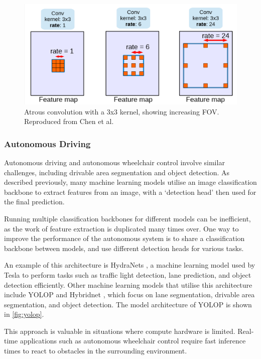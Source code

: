 \documentclass[12pt]{article}
\begin{document}
\begin{figure}[H]
    \centering
    \includegraphics[width=0.6\linewidth]{images/atrous_convolution.png}
    \caption{Atrous convolution with a 3x3 kernel, showing increasing FOV. Reproduced from Chen et al. \cite{chenRethinkingAtrousConvolution2017}}
    \label{fig:atrous_convolution}
\end{figure}

\subsubsection{Autonomous Driving}
Autonomous driving and autonomous wheelchair control involve similar challenges,
including drivable area segmentation and object detection. As described previously, many machine learning
models utilise an image classification backbone to extract features from an image, with a `detection head'
then used for the final prediction.

Running multiple classification backbones for different models can be inefficient, as
the work of feature extraction is duplicated many times over. One way to improve the performance
of the autonomous system is to share a classification backbone between models, and use different detection
heads for various tasks.

An example of this architecture is HydraNets \cite{karpathyTeslaAIDay2021}, a machine learning model used by
Tesla to perform tasks such as traffic light detection, lane prediction, and object detection efficiently.
Other machine learning models that utilise this architecture include YOLOP \cite{wuYOLOPYouOnly2021} and
Hybridnet \cite{vuHybridNetsEndtoEndPerception2022}, which focus on lane segmentation, drivable area segmentation,
and object detection. The model architecture of YOLOP is shown in \cref{fig:yolop}.

This approach is valuable in situations where compute hardware is limited. Real-time applications such as
autonomous wheelchair control require fast inference times to react to obstacles in the surrounding environment.
\end{document}
